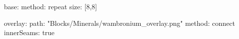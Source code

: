 base:
  method: repeat
  size: [8,8]

overlay:
  path: "Blocks/Minerals/wambronium_overlay.png"
  method: connect
  innerSeams: true